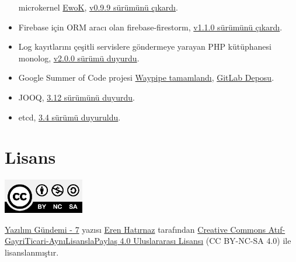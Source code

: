 \documentclass[11pt]{article}
\begin{document}
\begin{itemize}
microkernel \href{https://wookey-project.github.io/ewok/index.html}{EwoK}, \href{https://github.com/wookey-project/ewok-kernel/releases/tag/v0.9.9}{v0.9.9 sürümünü çıkardı}.
\item Firebase için ORM aracı olan firebase-firestorm, \href{https://github.com/lmcq/firebase-firestorm/releases/tag/v1.1.0}{v1.1.0 sürümünü çıkardı}.
\item Log kayıtlarını çeşitli servislere göndermeye yarayan PHP kütüphanesi
monolog, \href{https://github.com/Seldaek/monolog/releases/tag/2.0.0}{v2.0.0 sürümü duyurdu}.
\item Google Summer of Code projesi \href{https://lists.freedesktop.org/archives/wayland-devel/2019-August/040819.html}{Waypipe tamamlandı}, \href{https://gitlab.freedesktop.org/mstoeckl/waypipe/}{GitLab Deposu}.
\item JOOQ, \href{https://blog.jooq.org/2019/08/29/jooq-3-12-released-with-a-new-procedural-language-api/}{3.12 sürümünü duyurdu}.
\item etcd, \href{https://kubernetes.io/blog/2019/08/30/announcing-etcd-3-4/}{3.4 sürümü duyuruldu}.
\end{itemize}
\section{Lisans}
\label{sec:org3b731ad}
\begin{center}
\begin{center}
\includegraphics[height=1.5cm]{../../../img/CC_BY-NC-SA_4.0.png}
\end{center}

\href{yazilim-gundemi-07.pdf}{Yazılım Gündemi - 7} yazısı \href{https://erenhatirnaz.github.io}{Eren Hatırnaz} tarafından \href{http://creativecommons.org/licenses/by-nc-sa/4.0/}{Creative Commons
Atıf-GayriTicari-AynıLisanslaPaylaş 4.0 Uluslararası Lisansı} (CC BY-NC-SA 4.0)
ile lisanslanmıştır.
\end{center}
\end{document}
